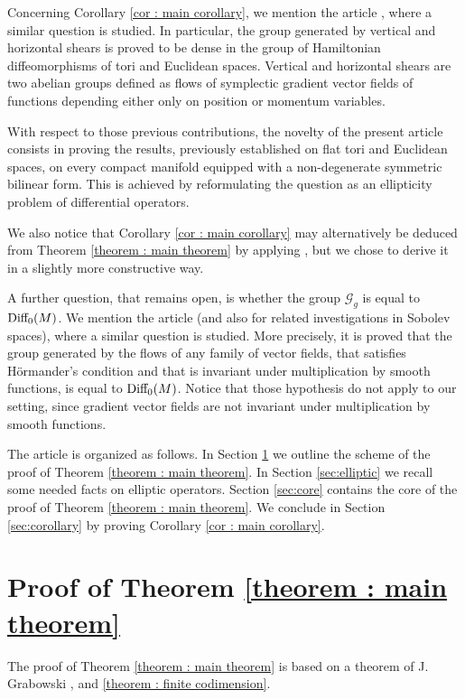 \documentclass[10pt]{article}
\begin{document}
Concerning Corollary \ref{cor : main corollary}, we mention the article \cite{berger}, where a similar question is studied. In particular, the group generated by vertical and horizontal shears is proved to be dense in the group of Hamiltonian diffeomorphisms of tori and Euclidean spaces. Vertical and horizontal shears are two abelian groups defined as flows of symplectic gradient vector fields of functions depending either only on position or momentum variables.

With respect to those previous contributions, the novelty of the present article consists in proving the results, previously established on flat tori and Euclidean spaces, on every compact manifold equipped with a non-degenerate symmetric bilinear form. This is achieved by reformulating the question as an ellipticity problem of differential operators.

We also notice that Corollary \ref{cor : main corollary} may alternatively be deduced from Theorem \ref{theorem : main theorem} by applying \cite[Theorem D]{Liu}, but we chose to derive it in a slightly more constructive way.

A further question, that remains open, is whether the group $\mathcal{G}_g$ is equal to ${\rm Diff_0}(M)$. We mention the article \cite{agrachev-caponigro} (and also \cite{trelat-2017} for related investigations in Sobolev spaces), where a similar question is studied. More precisely, it is proved that the group generated by the flows of any family of vector fields, that satisfies Hörmander's condition and that is invariant under multiplication by smooth functions, is equal to ${\rm Diff_0}(M)$. Notice that those hypothesis do not apply to our setting, since gradient vector fields are not invariant under multiplication by smooth functions.


\medskip

The article is organized as follows. In Section \ref{sec:outline} we outline the scheme of the proof of Theorem \ref{theorem : main theorem}. In Section \ref{sec:elliptic} we recall some needed facts on elliptic operators. Section \ref{sec:core} contains the core of the proof of Theorem \ref{theorem : main theorem}. We conclude in Section \ref{sec:corollary} by proving Corollary \ref{cor : main corollary}.




\section{Proof of Theorem \ref{theorem : main theorem}}\label{sec:outline}
The proof of Theorem \ref{theorem : main theorem} is based on a theorem of J. Grabowski \cite{grabowski}, and \cref{theorem : finite codimension}.
\end{document}
